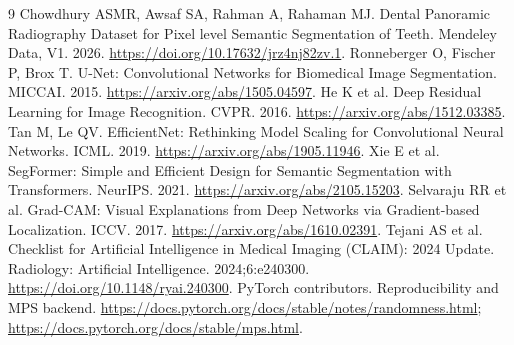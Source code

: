 \documentclass[11pt]{article}
\begin{document}
\begin{thebibliography}{9}
 Chowdhury ASMR, Awsaf SA, Rahman A, Rahaman MJ. Dental Panoramic Radiography Dataset for Pixel level Semantic Segmentation of Teeth. Mendeley Data, V1. 2026. \url{https://doi.org/10.17632/jrz4nj82zv.1}.
 Ronneberger O, Fischer P, Brox T. U-Net: Convolutional Networks for Biomedical Image Segmentation. MICCAI. 2015. \url{https://arxiv.org/abs/1505.04597}.
 He K et al. Deep Residual Learning for Image Recognition. CVPR. 2016. \url{https://arxiv.org/abs/1512.03385}.
 Tan M, Le QV. EfficientNet: Rethinking Model Scaling for Convolutional Neural Networks. ICML. 2019. \url{https://arxiv.org/abs/1905.11946}.
 Xie E et al. SegFormer: Simple and Efficient Design for Semantic Segmentation with Transformers. NeurIPS. 2021. \url{https://arxiv.org/abs/2105.15203}.
 Selvaraju RR et al. Grad-CAM: Visual Explanations from Deep Networks via Gradient-based Localization. ICCV. 2017. \url{https://arxiv.org/abs/1610.02391}.
 Tejani AS et al. Checklist for Artificial Intelligence in Medical Imaging (CLAIM): 2024 Update. Radiology: Artificial Intelligence. 2024;6:e240300. \url{https://doi.org/10.1148/ryai.240300}.
 PyTorch contributors. Reproducibility and MPS backend. \url{https://docs.pytorch.org/docs/stable/notes/randomness.html}; \url{https://docs.pytorch.org/docs/stable/mps.html}.
\end{thebibliography}
\end{document}
